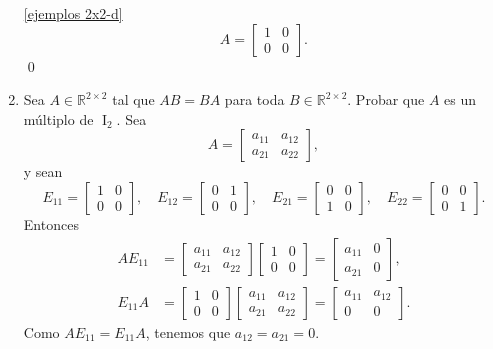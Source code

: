 \begin{enumerate}[topsep=6pt,itemsep=.4cm]
\noindent\ref{ejemplos 2x2-d}
\begin{equation*}
    A = \begin{bmatrix}
        1 & 0\\ 0 & 0
        \end{bmatrix}.
\end{equation*}
\qed


\item\label{2x2 central}  Sea $A \in\mathbb{R}^{2\times 2}$ tal que $AB=BA$ para toda $B\in\mathbb{R}^{2\times 2}$. Probar que $A$ es un múltiplo de $\operatorname{I}_2$.
\rta Sea
\begin{equation*}
    A = \begin{bmatrix} a_{11} & a_{12}\\ a_{21} & a_{22} \end{bmatrix},
\end{equation*}
y sean 
\begin{equation*}
    E_{11} = \begin{bmatrix} 1 & 0\\ 0 & 0\end{bmatrix},
    \quad
    E_{12} = \begin{bmatrix} 0 & 1\\ 0 & 0\end{bmatrix},
    \quad
    E_{21} = \begin{bmatrix} 0 & 0\\ 1 & 0\end{bmatrix},
    \quad
    E_{22} = \begin{bmatrix} 0 & 0\\ 0 & 1\end{bmatrix}. 
\end{equation*}
Entonces 
\begin{align*}
    AE_{11} &= \begin{bmatrix} a_{11} & a_{12}\\ a_{21} & a_{22} \end{bmatrix} \begin{bmatrix} 1 & 0\\ 0 & 0\end{bmatrix} =
    \begin{bmatrix} a_{11} &0\\ a_{21} & 0\end{bmatrix}, \\
    E_{11}A &=  \begin{bmatrix} 1 & 0\\ 0 & 0\end{bmatrix} \begin{bmatrix} a_{11} & a_{12}\\ a_{21} & a_{22} \end{bmatrix}=
    \begin{bmatrix} a_{11} & a_{12}\\ 0 & 0 \end{bmatrix}.
\end{align*}
Como $AE_{11} = E_{11}A$, tenemos que $a_{12} = a_{21} =0$.


\end{enumerate}
